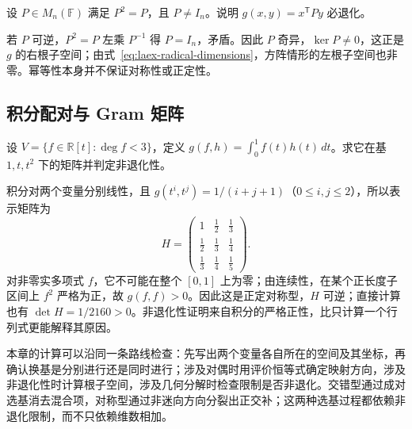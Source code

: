 \begin{example}
\label{ex:laex-idempotent-form}
设 $P\in M_n(\mathbb F)$ 满足 $P^2=P$，且 $P\ne I_n$。说明 $g(x,y)=x^{\mathsf T}Py$ 必退化。
\end{example}
\begin{solve}
若 $P$ 可逆，$P^2=P$ 左乘 $P^{-1}$ 得 $P=I_n$，矛盾。因此 $P$ 奇异，$\ker P\ne0$，这正是 $g$ 的右根子空间；由式~\eqref{eq:laex-radical-dimensions}，方阵情形的左根子空间也非零。幂等性本身并不保证对称性或正定性。
\end{solve}

\subsection{积分配对与 Gram 矩阵}

\begin{example}
\label{ex:laex-polynomial-integral-form}
设 $V=\{f\in\mathbb R[t]:\deg f<3\}$，定义 $g(f,h)=\int_0^1 f(t)h(t)\,dt$。求它在基 $1,t,t^2$ 下的矩阵并判定非退化性。
\end{example}
\begin{solve}
积分对两个变量分别线性，且 $g(t^i,t^j)=1/(i+j+1)$（$0\le i,j\le2$），所以表示矩阵为
\[
 H=\begin{pmatrix}
 1&\tfrac12&\tfrac13\\
 \tfrac12&\tfrac13&\tfrac14\\
 \tfrac13&\tfrac14&\tfrac15
 \end{pmatrix}.
\]
对非零实多项式 $f$，它不可能在整个 $[0,1]$ 上为零；由连续性，在某个正长度子区间上 $f^2$ 严格为正，故 $g(f,f)>0$。因此这是正定对称型，$H$ 可逆；直接计算也有 $\det H=1/2160>0$。非退化性证明来自积分的严格正性，比只计算一个行列式更能解释其原因。
\end{solve}

本章的计算可以沿同一条路线检查：先写出两个变量各自所在的空间及其坐标，再确认换基是分别进行还是同时进行；涉及对偶时用评价恒等式确定映射方向，涉及非退化性时计算根子空间，涉及几何分解时检查限制是否非退化。交错型通过成对选基消去混合项，对称型通过非迷向方向分裂出正交补；这两种选基过程都依赖非退化限制，而不只依赖维数相加。



